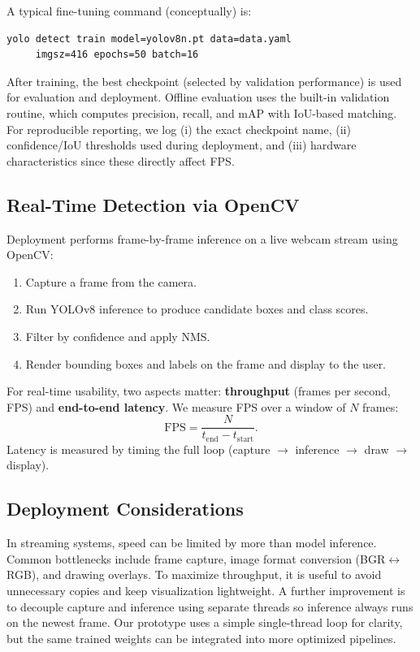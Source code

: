 \documentclass[conference]{IEEEtran}
\begin{document}
A typical fine-tuning command (conceptually) is:
\begin{verbatim}
yolo detect train model=yolov8n.pt data=data.yaml
     imgsz=416 epochs=50 batch=16
\end{verbatim}
After training, the best checkpoint (selected by validation performance) is used for evaluation and deployment. Offline evaluation uses the built-in validation routine, which computes precision, recall, and mAP with IoU-based matching. For reproducible reporting, we log (i) the exact checkpoint name, (ii) confidence/IoU thresholds used during deployment, and (iii) hardware characteristics since these directly affect FPS.

\subsection{Real-Time Detection via OpenCV}
Deployment performs frame-by-frame inference on a live webcam stream using OpenCV:
\begin{enumerate}
    \item Capture a frame from the camera.
    \item Run YOLOv8 inference to produce candidate boxes and class scores.
    \item Filter by confidence and apply NMS.
    \item Render bounding boxes and labels on the frame and display to the user.
\end{enumerate}
For real-time usability, two aspects matter: \textbf{throughput} (frames per second, FPS) and \textbf{end-to-end latency}. We measure FPS over a window of $N$ frames:
\begin{equation}
\mathrm{FPS} = \frac{N}{t_{\mathrm{end}} - t_{\mathrm{start}}}.
\end{equation}
Latency is measured by timing the full loop (capture $\rightarrow$ inference $\rightarrow$ draw $\rightarrow$ display).

\subsection{Deployment Considerations}
In streaming systems, speed can be limited by more than model inference. Common bottlenecks include frame capture, image format conversion (BGR$\leftrightarrow$RGB), and drawing overlays. To maximize throughput, it is useful to avoid unnecessary copies and keep visualization lightweight. A further improvement is to decouple capture and inference using separate threads so inference always runs on the newest frame. Our prototype uses a simple single-thread loop for clarity, but the same trained weights can be integrated into more optimized pipelines.
\end{document}
